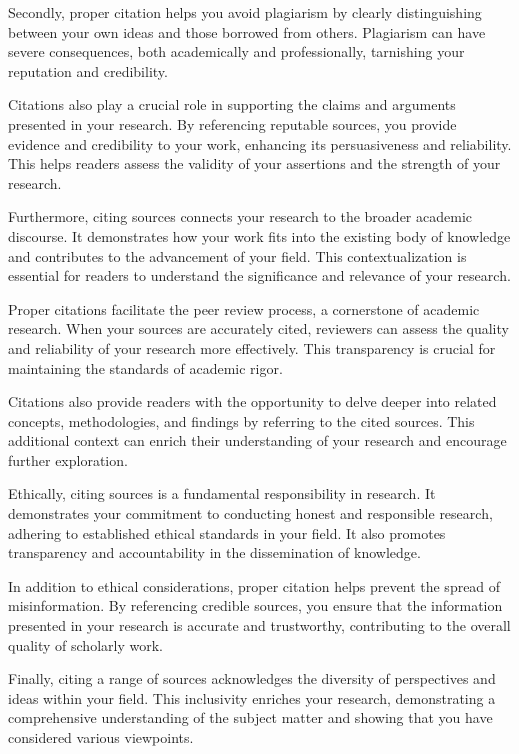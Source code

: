 \documentclass[
  b5paper]{book}
\begin{document}
Secondly, proper citation helps you avoid plagiarism by clearly distinguishing between your own ideas and those borrowed from others. Plagiarism can have severe consequences, both academically and professionally, tarnishing your reputation and credibility.

Citations also play a crucial role in supporting the claims and arguments presented in your research. By referencing reputable sources, you provide evidence and credibility to your work, enhancing its persuasiveness and reliability. This helps readers assess the validity of your assertions and the strength of your research.

Furthermore, citing sources connects your research to the broader academic discourse. It demonstrates how your work fits into the existing body of knowledge and contributes to the advancement of your field. This contextualization is essential for readers to understand the significance and relevance of your research.

Proper citations facilitate the peer review process, a cornerstone of academic research. When your sources are accurately cited, reviewers can assess the quality and reliability of your research more effectively. This transparency is crucial for maintaining the standards of academic rigor.

Citations also provide readers with the opportunity to delve deeper into related concepts, methodologies, and findings by referring to the cited sources. This additional context can enrich their understanding of your research and encourage further exploration.

Ethically, citing sources is a fundamental responsibility in research. It demonstrates your commitment to conducting honest and responsible research, adhering to established ethical standards in your field. It also promotes transparency and accountability in the dissemination of knowledge.

In addition to ethical considerations, proper citation helps prevent the spread of misinformation. By referencing credible sources, you ensure that the information presented in your research is accurate and trustworthy, contributing to the overall quality of scholarly work.

Finally, citing a range of sources acknowledges the diversity of perspectives and ideas within your field. This inclusivity enriches your research, demonstrating a comprehensive understanding of the subject matter and showing that you have considered various viewpoints.
\end{document}
